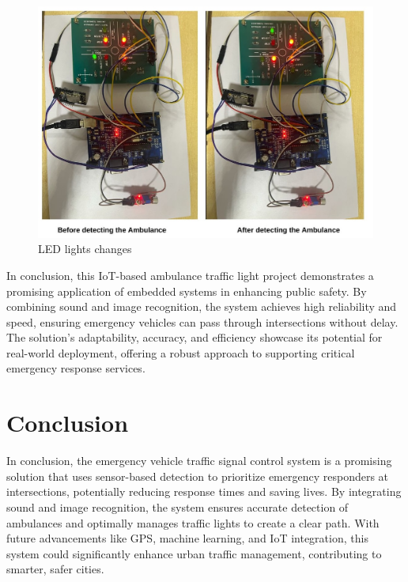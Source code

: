 \documentclass[conference]{IEEEtran}
\begin{document}
\begin{itemize}
\begin{figure}[htbp]
    \centering
    \includegraphics[width=1\linewidth]{Your paragraph text.jpg}
    \caption{LED lights changes}
    \label{fig:enter-label}
\end{figure}

In conclusion, this IoT-based ambulance traffic light project demonstrates a promising application of embedded systems in enhancing public safety. By combining sound and image recognition, the system achieves high reliability and speed, ensuring emergency vehicles can pass through intersections without delay. The solution’s adaptability, accuracy, and efficiency showcase its potential for real-world deployment, offering a robust approach to supporting critical emergency response services.
\end{itemize}

\section{Conclusion}
\textbf{} In conclusion, the emergency vehicle traffic signal control system is a promising solution that uses sensor-based detection to prioritize emergency responders at intersections, potentially reducing response times and saving lives. By integrating sound and image recognition, the system ensures accurate detection of ambulances and optimally manages traffic lights to create a clear path. With future advancements like GPS, machine learning, and IoT integration, this system could significantly enhance urban traffic management, contributing to smarter, safer cities.
\end{document}
